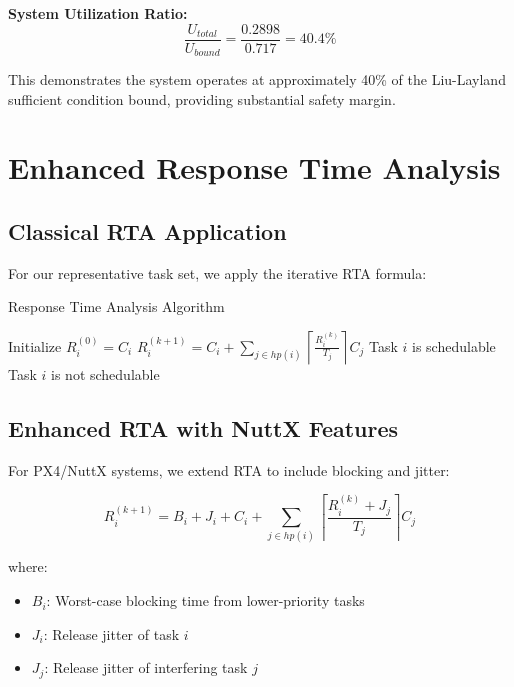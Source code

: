 \documentclass[12pt,a4paper]{article}
\begin{document}
\textbf{System Utilization Ratio:}
$$\frac{U_{total}}{U_{bound}} = \frac{0.2898}{0.717} = 40.4\%$$

This demonstrates the system operates at approximately 40\% of the Liu-Layland sufficient condition bound, providing substantial safety margin.

\section{Enhanced Response Time Analysis}

\subsection{Classical RTA Application}

For our representative task set, we apply the iterative RTA formula:

\begin{algorithm}[H]
\caption{Response Time Analysis Algorithm}
\begin{algorithmic}
\State Initialize $R_i^{(0)} = C_i$
    \State $R_i^{(k+1)} = C_i + \sum_{j \in hp(i)} \left\lceil \frac{R_i^{(k)}}{T_j} \right\rceil C_j$
\EndWhile
{}
    \State Task $i$ is schedulable
\Else
    \State Task $i$ is not schedulable
\EndIf
\end{algorithmic}
\end{algorithm}

\subsection{Enhanced RTA with NuttX Features}

For PX4/NuttX systems, we extend RTA to include blocking and jitter:

\begin{equation}
R_i^{(k+1)} = B_i + J_i + C_i + \sum_{j \in hp(i)} \left\lceil \frac{R_i^{(k)} + J_j}{T_j} \right\rceil C_j
\end{equation}

where:
\begin{itemize}
\item $B_i$: Worst-case blocking time from lower-priority tasks
\item $J_i$: Release jitter of task $i$
\item $J_j$: Release jitter of interfering task $j$
\end{itemize}
\end{document}
